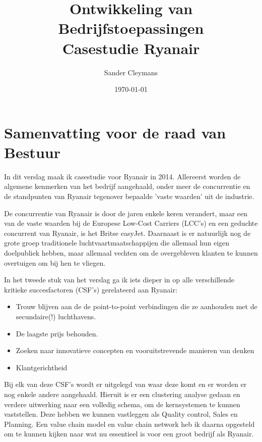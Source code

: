 \documentclass{article}
\author{Sander Cleymans}
\date{\today}
\title{Ontwikkeling van Bedrijfstoepassingen \\
		Casestudie Ryanair}
\begin{document}
 

\maketitle

\newpage  

\tableofcontents

\newpage
\part{Samenvatting voor de raad van Bestuur}

In dit verslag maak ik casestudie voor Ryanair in 2014.
Allereerst worden de algemene kenmerken van het bedrijf aangehaald, onder meer de concurrentie en de standpunten van Ryanair tegenover bepaalde 'vaste waarden' uit de industrie.
   
De concurrentie van Ryanair is door de jaren enkele keren verandert, maar een van de vaste waarden bij de Europese Low-Cost Carriers (LCC's) en een geduchte concurrent van Ryanair, is het Britse easyJet. Daarnaast is er natuurlijk nog de grote groep traditionele luchtvaartmaatschappijen die allemaal hun eigen doelpubliek hebben, maar allemaal vechten om de overgebleven klanten te kunnen overtuigen om bij hen te vliegen.
	
In het tweede stuk van het verslag ga ik iets dieper in op alle verschillende kritieke succesfactoren (CSF's) gerelateerd aan Ryanair:

\begin{itemize}
\item Trouw blijven aan de de point-to-point verbindingen die ze aanhouden met de secundaire(!) luchthavens.
\item De laagste prijs behouden.
\item Zoeken naar innovatieve concepten en vooruitstrevende manieren van denken
\item Klantgerichtheid
\end{itemize}

Bij elk van deze CSF's wordt er uitgelegd van waar deze komt en er worden er nog enkele andere aangehaald.
Hieruit is er een clustering analyse gedaan en verdere uitwerking naar een volledig schema, om de kernsystemen te kunnen vaststellen. Deze hebben we kunnen vastleggen als Quality control, Sales en Planning. Een value chain model en value chain network heb ik daarna opgesteld om te kunnen kijken naar wat nu essentieel is voor een groot bedrijf als Ryanair.
\end{document}
